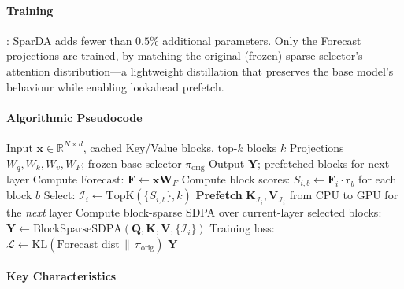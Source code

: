 \paragraph{Training}: SparDA adds fewer than $0.5\%$ additional parameters. Only the Forecast projections are trained, by matching the original (frozen) sparse selector's attention distribution---a lightweight distillation that preserves the base model's behaviour while enabling lookahead prefetch.

\paragraph{Algorithmic Pseudocode}

\begin{algorithm}[H]
\caption{SparDA: Sparse Decoupled Attention with Forecast Prefetch}
\begin{algorithmic}[1]
\Require Input $\mathbf{x} \in \mathbb{R}^{N \times d}$, cached Key/Value blocks, top-$k$ blocks $k$
\Require Projections $W_q, W_k, W_v, W_F$; frozen base selector $\pi_{\text{orig}}$
\Ensure Output $\mathbf{Y}$; prefetched blocks for next layer
\State Compute Forecast: $\mathbf{F} \gets \mathbf{x} \mathbf{W}_F$ 
    \State Compute block scores: $S_{i,b} \gets \mathbf{F}_i \cdot \mathbf{r}_b$ for each block $b$
    \State Select: $\mathcal{I}_i \gets \mathrm{TopK}(\{S_{i,b}\}, k)$
    \State \textbf{Prefetch} $\mathbf{K}_{\mathcal{I}_i}, \mathbf{V}_{\mathcal{I}_i}$ from CPU to GPU for the \emph{next} layer 
\EndFor
\State Compute block-sparse SDPA over current-layer selected blocks: $\mathbf{Y} \gets \mathrm{BlockSparseSDPA}(\mathbf{Q}, \mathbf{K}, \mathbf{V}, \{\mathcal{I}_i\})$
\State Training loss: $\mathcal{L} \gets \mathrm{KL}(\text{Forecast dist} \,\|\, \pi_{\text{orig}})$ 
\Return $\mathbf{Y}$
\end{algorithmic}
\end{algorithm}

\paragraph{Key Characteristics}

